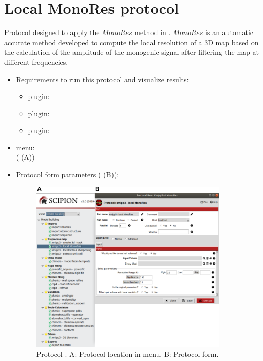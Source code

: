 \section{Local MonoRes protocol}
\label{app:localMonoRes}%

Protocol designed to apply the $MonoRes$ method \citep{vilas2018} in \scipion. $MonoRes$ is an automatic accurate method developed to compute the local resolution of a 3D map based on the calculation of the amplitude of the monogenic signal after filtering the map at different frequencies.

\begin{itemize}
 \item Requirements to run this protocol and visualize results:
    \begin{itemize}
        \item \scipion plugin: 
        \item \scipion plugin: 
        \item \scipion plugin: 
    \end{itemize}
 \item \scipion menu:\\
   ( (A))
  
 \item Protocol form parameters ( (B)):
  
    \begin{figure}[H]
     \centering 
     \captionsetup{width=.7\linewidth} 
     \includegraphics[width=0.90\textwidth]{Images_appendix/Fig207}
     \caption{Protocol . A: Protocol location in \scipion menu. B: Protocol form.}
     \label{fig:app_localMonoRes_1}
    \end{figure}
    

\end{itemize}
